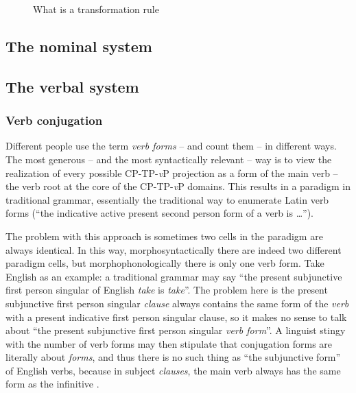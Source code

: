 \documentclass[a4paper, oneside, 12pt]{report}
\newcommand*{\citepage}[1]{p.~{#1}}
\newcommand*{\term}[1]{\emph{#1}}
\newcommand{\form}[1]{\emph{#1}}
\newcommand{\vP}{\textit{v}P}
\begin{document}
{\begin{figure}[H]
    \caption{What is a transformation rule}
    \label{fig:transformation-rule}        
\end{figure}

\subsection{The nominal system}

\subsection{The verbal system}

\subsubsection{Verb conjugation}\label{sec:conjugation-form}

Different people use the term \term{verb forms} -- and count them -- in different ways.
The most generous -- and the most syntactically relevant -- way 
is to view the realization of every possible CP-TP-\vP{} projection 
as a form of the main verb -- the verb root at the core of the CP-TP-\vP{} domains.
This results in a paradigm in traditional grammar, 
essentially the traditional way to enumerate Latin verb forms 
(``the indicative active present second person form of a verb is \dots'').

The problem with this approach is sometimes two cells in the paradigm are always identical.
In this way, morphosyntactically there are indeed two different paradigm cells,
but morphophonologically there is only one verb form.
Take English as an example: 
a traditional grammar may say 
``the present subjunctive first person singular of English \form{take} is \form{take}''. 
The problem here is the present subjunctive first person singular \emph{clause}
always contains the same form of the \emph{verb}
with a present indicative first person singular clause,
so it makes no sense to talk about ``the present subjunctive first person singular \emph{verb form}''.
A linguist stingy with the number of verb forms 
may then stipulate that conjugation forms are literally about \emph{forms},
and thus there is no such thing as ``the subjunctive form'' of English verbs,
because in subject \emph{clauses}, 
the main verb always has the same form as the infinitive
\citep[\citepage{76}]{cgel}.

}
\end{document}
